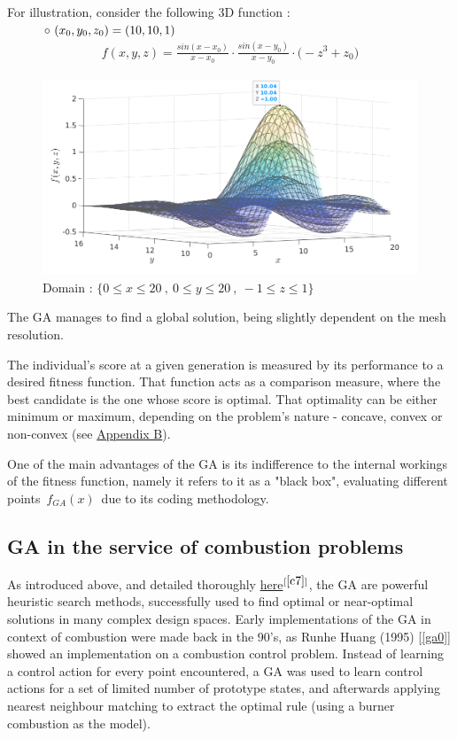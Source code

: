 \documentclass[12pt]{article}
\newcommand\tab[1][1cm]{\hspace*{#1}}
\numberwithin{equation}{section}
\begin{document}
\begin{flushleft}
For illustration, consider the following 3D function : $\tab \circ \ ( x_0, y_0, z_0 ) = ( 10, 10, 1 )$ 
\begin{align*}
f(x, y, z) = \frac{sin(x-x_0)}{x-x_0} \cdot \frac{sin(x-y_0)}{x-y_0} \cdot \Big( -z^3 + z_0 \Big)
\end{align*}

\begin{figure}[H]
\centering
\includegraphics[width=0.9\linewidth, center]{graph_3D.png}
\caption*{Domain : $\{ 0 \leq x \leq 20 \ , \ 0 \leq y \leq 20 \ , \ -1 \leq z \leq 1 \}$}
\end{figure}
The GA manages to find a global solution, being slightly dependent on the mesh resolution.

The individual's score at a given generation is measured by its performance to a desired fitness function. That function acts as a comparison measure, where the best candidate is the one whose score is optimal. That optimality can be either minimum or maximum, depending on the problem's nature - concave, convex or non-convex (see \hyperlink{app_convex}{Appendix B}).

One of the main advantages of the GA is its indifference to the internal workings of the fitness function, namely it refers to it as a "black box", evaluating different points \,$f_{GA}(x)$\, due to its coding methodology.

\subsection{GA in the service of combustion problems}

As introduced above, and detailed thoroughly \href{https://www.cs.colostate.edu/~genitor/MiscPubs/tutorial.pdf}{here}$^{[\ref{c7}]}$, the GA are powerful heuristic search methods, successfully used to find optimal or near-optimal solutions in many complex design spaces. Early implementations of the GA in context of combustion were made back in the 90's, as Runhe Huang (1995) [\ref{ga0}] showed an implementation on a combustion control problem. Instead of learning a control action for every point encountered, a GA was used to learn control actions for a set of limited number of prototype states, and afterwards applying nearest neighbour matching to extract the optimal rule (using a burner combustion as the model). 


\end{flushleft}
\end{document}
